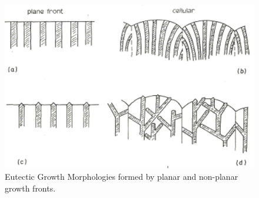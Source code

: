 %
\vspace{1cm}
\begin{figure}[H]
\begin{center}
\includegraphics[width=.6\textwidth]{growthmorphologies}
\caption{Eutectic Growth Morphologies formed by planar and non-planar growth fronts.}\label{fig:growthmorphologies}
\end{center}
\end{figure}
%

